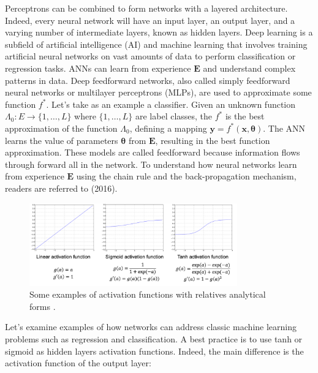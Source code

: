 Perceptrons can be combined to form networks with a layered architecture. Indeed, every neural network will have an input layer, an output layer, and a varying number of intermediate layers, known as hidden layers. Deep learning is a subfield of artificial intelligence (AI) and machine learning that involves training artificial neural networks on vast amounts of data to perform classification or regression tasks. ANNs can learn from experience $\mathbf{E}$ and understand complex patterns in data. Deep feedforward networks, also called simply feedforward neural networks or multilayer perceptrons (MLPs), are used to approximate some function $f^*$. Let's take as an example a classifier. Given an unknown function $\Lambda_0:E \rightarrow \{1,\dots,L\}$ where $\{1,\dots,L\}$ are label classes, the $f^*$ is the best approximation of the function $\Lambda_0$, defining a mapping $\mathbf{y}=f^*\left(\mathbf{x}, \bm{\theta} \right)$. The ANN learns the value of parameters $\bm{\theta}$ from $\mathbf{E}$, resulting in the best function approximation. These models are called feedforward because information flows through forward all in the network. To understand how neural networks learn from experience $\mathbf{E}$ using the chain rule and the back-propagation mechanism, readers are referred to \citeauthor{goodfellow_deep_2016} (2016).
\begin{figure}
    \centering
    \includegraphics[width=0.8\textwidth]{Images/activationfunction.png}
    \caption[Activation functions.]{Some examples of activation functions with relatives analytical forms \cite{matteo_matteucci_perceptrons_2021}.}
    \label{fig:actfunc}
\end{figure}
Let's examine examples of how networks can address classic machine learning problems such as regression and classification. A best practice is to use tanh or sigmoid as hidden layers activation functions. Indeed, the main difference is the activation function of the output layer: 
